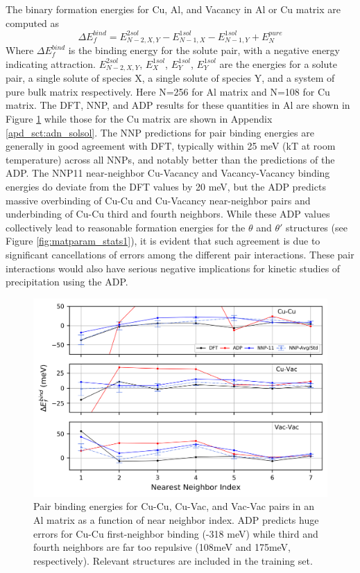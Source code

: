 \documentclass{article}
\begin{document}
The binary formation energies for Cu, Al, and Vacancy in Al or Cu matrix are computed as
\begin{equation}
\Delta E^{bind}_f = E^{2sol}_{N-2,X,Y}-E^{1sol}_{N-1,X}-E^{1sol}_{N-1,Y}+E^{pure}_N
\end{equation}
Where $\Delta E^{bind}_f$ is the binding energy for the solute pair, with a negative energy indicating attraction.
$E^{2sol}_{N-2,X,Y}$, $E^{1sol}_{X}$, $E^{1sol}_{Y}$, $E^{1sol}_{Y}$ are the energies for a solute pair, a single solute of species X, a single solute of species Y, and a system of pure bulk matrix respectively. 
Here N=256 for Al matrix and N=108 for Cu matrix. 
The DFT, NNP, and ADP results for these quantities in Al are shown in Figure \ref{fig:solsol_in_al} while those for the Cu matrix are shown in Appendix \ref{apd_sct:adn_solsol}.  The NNP predictions for pair binding energies are generally in good agreement with DFT, typically within 25 meV (kT at room temperature) across all NNPs, and notably better than the predictions of the ADP.  The NNP11 near-neighbor Cu-Vacancy and Vacancy-Vacancy binding energies do deviate from the DFT values by 20 meV, but the ADP predicts massive overbinding of Cu-Cu and Cu-Vacancy near-neighbor pairs and underbinding of Cu-Cu third and fourth neighbors.  While these ADP values collectively lead to reasonable formation energies for the $\theta$ and $\theta'$ structures (see Figure \ref{fig:matparam_stats1}), it is evident that such agreement is due to significant cancellations of errors among the different pair interactions.  These pair interactions would also have serious negative implications for kinetic studies of precipitation using the ADP.

\begin{figure}[H]%
\centering%
\includegraphics[width=1\textwidth,center]{./figures/solsol_in_al.png}%
\caption{Pair binding energies for Cu-Cu, Cu-Vac, and Vac-Vac pairs in an Al matrix as a function of near neighbor index. 
ADP predicts huge errors for Cu-Cu first-neighbor binding (-318 meV) 
while third and fourth neighbors are far too repulsive (108meV and 175meV, respectively). 
Relevant structures are included in the training set.
}%
\label{fig:solsol_in_al}
\end{figure}
\end{document}
